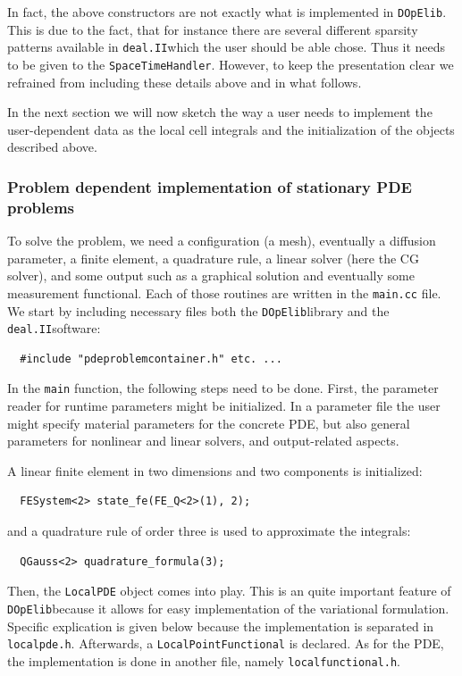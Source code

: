 \documentclass[prodmode,acmtoms]{acmsmall}
\numberwithin{equation}{section}
\newcommand{\deal}{\texttt{deal.II}}
\newcommand{\dope}{\texttt{DOpElib}}
\begin{document}
\begin{remark}
In fact, the above constructors are not exactly what is implemented in \dope.
This is due to the fact, that for instance 
there are several different sparsity patterns available in 
\deal which the user should be able chose. Thus it needs to be 
given to the \texttt{SpaceTimeHandler}. However, to keep the 
presentation clear we refrained from including these details above and in
what follows.
\end{remark}

In the next section we will now sketch the way a user needs to implement the
user-dependent data as the local cell integrals and the initialization of the
objects described above.
\subsubsection{Problem dependent implementation of stationary PDE problems}

 
To solve the problem, we need a configuration (a mesh), eventually 
a diffusion parameter, a finite element, a quadrature rule,
a linear solver (here the CG solver), and some output such as
a graphical solution and eventually some measurement functional.
Each of those routines are written in the \texttt{main.cc} file. 
We start by including necessary files both the \dope library and
the \deal software:
\begin{lstlisting}
  #include "pdeproblemcontainer.h" etc. ...
\end{lstlisting}
In the \texttt{main} function, the following steps need to be done. First, 
the parameter reader for runtime parameters might be initialized. In a parameter
file the user might specify material parameters for the concrete PDE, but also
general parameters for nonlinear and linear solvers, and output-related 
aspects.

A linear finite element in two dimensions and two components is 
initialized:
\begin{lstlisting}
  FESystem<2> state_fe(FE_Q<2>(1), 2);
\end{lstlisting}
and a quadrature rule of order three is used to approximate the 
integrals:
\begin{lstlisting}
  QGauss<2> quadrature_formula(3);
\end{lstlisting}
Then, the \texttt{LocalPDE} object comes into play. This is an quite 
important feature of \dope because it allows for easy implementation 
of the variational formulation. Specific explication is given below because
the implementation is separated in \texttt{localpde.h}.
Afterwards, a \texttt{LocalPointFunctional} is declared. As for the PDE, the 
implementation is done in another file, namely \texttt{localfunctional.h}.
\end{document}
